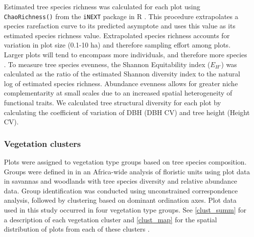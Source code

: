 \documentclass[11pt,a4paper]{article}
\begin{document}
Estimated tree species richness was calculated for each plot using \verb|ChaoRichness()| from the \verb|iNEXT| package in R \citep{Hsieh2016}. This procedure extrapolates a species rarefaction curve to its predicted asymptote and uses this value as its estimated species richness value. Extrapolated species richness accounts for variation in plot size (0.1-10 ha) and therefore sampling effort among plots. Larger plots will tend to encompass more individuals, and therefore more species \citep{Dengler2009}. To measure tree species  evenness, the Shannon Equitability index ($E_{H'}$) \citep{Smith1996} was calculated as the ratio of the estimated Shannon diversity index to the natural log of estimated species richness. Abundance evenness allows for greater niche complementarity at small scales due to an increased spatial heterogeneity of functional traits. We calculated tree structural diversity for each plot by calculating the coefficient of variation of DBH (DBH CV) and tree height (Height CV). 

% 

\subsubsection{Vegetation clusters}

Plots were assigned to vegetation type groups based on tree species composition. Groups were defined in \citet{Fayolle2018} in an Africa-wide analysis of floristic units using plot data in savannas and woodlands with tree species diversity and relative abundance data. Group identification was conducted using unconstrained correspondence analysis, followed by clustering based on dominant ordination axes. Plot data used in this study occurred in four vegetation type groups. See \autoref{clust_summ} for a description of each vegetation cluster and \autoref{clust_map} for the spatial distribution of plots from each of these clusters .
\end{document}
